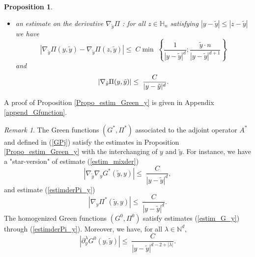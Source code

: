 \documentclass[11pt, reqno]{amsart}
\newtheorem{proposition}[theorem]{Proposition}
\theoremstyle{definition}
\theoremstyle{remark}
\newtheorem{remark}[theorem]{Remark}
\numberwithin{equation}{section}
\begin{document}
\begin{proposition}
\begin{itemize}
\begin{equation}
			\end{equation}
			and 
			\begin{equation}\label{estimPi_y}
				| \Pi(y,\tilde{y})| \leq C \min \;\left\{\frac{1 }{|y-\tilde{y}|^{d-1}}  ,\frac{\tilde{y}\cdot n }{|y-\tilde{y}|^{d}}   \right\} ,
			\end{equation}		
		\item 	an estimate on the derivative $\nabla_{\tilde{y}} \Pi$  :   for all $z\in \mathbb{H}_n$ satisfying $|y-\tilde{y}|\leq |z-\tilde{y}|$ we have
			\begin{equation}\label{estim_diff_derPi_y}
				|\nabla_{\tilde{y}} \Pi(y,\tilde{y}) - \nabla_{\tilde{y}} \Pi(z,\tilde{y})|\leq \;C \min \;\left\{\frac{ 1}{|y-\tilde{y}|^{d}}; \frac{\tilde{y}\cdot n }{|y-\tilde{y}|^{d+1}}   \right\} 
			\end{equation}	
			and 	\begin{equation}\label{estimderPi_y}
				|\nabla_{\tilde{y}} \Pi(y,\tilde{y})|\leq \;\frac{C }{|y-\tilde{y}|^{d}}  .\\
			\end{equation}				
			
		\end{itemize}

	\end{proposition}	
	
\noindent	A proof of  Proposition \ref{Propo_estim_Green_y} is given in Appendix \ref{append_Gfunction}.
	
	
	
	
	\begin{remark}
	The Green functions  $(G^*, \Pi^*)$ associated to the adjoint operator $A^*$ and defined in (\ref{GPj}) satisfy the estimates in Proposition \ref{Propo_estim_Green_y} with the interchanging of $y$ and $\tilde{y}$. For instance, we have a "star-version" of estimate (\ref{estim_mixder})
		\begin{equation}\label{estim_mixderG*}
		|\nabla_{\tilde{y}} \nabla_y G^*(\tilde{y},y)| \leq  \; \frac{C }{|y-\tilde{y}|^d} ,
	\end{equation}
and estimate	(\ref{estimderPi_y})
		\begin{equation}\label{estimderPi*_y}
		|\nabla_{y} \Pi^*(\tilde{y},y)|\leq \;\frac{C }{|y-\tilde{y}|^{d}}  .
	\end{equation}
		The homogenized Green functions $(G^0, \Pi^0)$ satisfy  estimates \textup{(\ref{estim_G_y})} through \textup{(\ref{estimderPi_y})}. Moreover, we have, for all $\lambda\in \mathbb{N}^d$, 
		\begin{equation}\label{estim_der_G0}
			| \partial^\lambda_y  G^0(y,\tilde{y})| \leq  \; \frac{C }{|y-\tilde{y}|^{d-2+|\lambda|}} .
		\end{equation}
		
	\end{remark}
	
\end{document}
